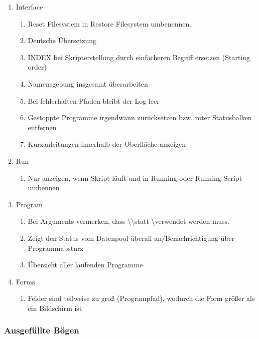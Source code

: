 \begin{enumerate}
\item Interface
\begin{enumerate}
	\item Reset Filesystem in Restore Filesystem umbenennen.
	\item Deutsche Übersetzung
	\item INDEX bei Skripterstellung durch einfacheren Begriff ersetzen (Starting order)
	\item Namensgebung insgesamt überarbeiten
	\item Bei fehlerhaften Pfaden bleibt der Log leer
	\item Gestoppte Programme irgendwann zurücksetzen bzw. roter Statusbalken entfernen
	\item Kurzanleitungen innerhalb der Oberfläche anzeigen
\end{enumerate}
\item Run
\begin{enumerate}
	\item Nur anzeigen, wenn Skript läuft und in Running oder Running Script umbennen
\end{enumerate}
\item Program
\begin{enumerate}
	\item Bei Arguments vermerken, dass \textbackslash\textbackslash statt \textbackslash verwendet werden muss.
	\item Zeigt den Status vom Datenpool überall an/Benachrichtigung über Programmabsturz
	\item Übersicht aller laufenden Programme
\end{enumerate}
\item Forms
\begin{enumerate}
		\item Felder sind teilweise zu groß (Programpfad), wodurch die Form größer als ein Bildschirm ist
\end{enumerate}
\end{enumerate}
\subsubsection{Ausgefüllte Bögen}
\begin{center}
	
\end{center}
